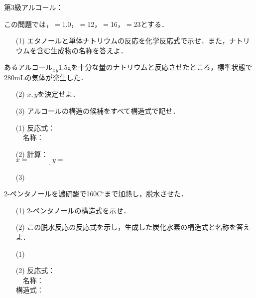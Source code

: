 \documentclass[a4paper,12pt]{ltjsreport}
\begin{document}
    \noindent 第3級アルコール：\newpage
    \begin{que}
        この問題では，$=$1.0，$=$12，$=$16，$=$23とする．
    \begin{itemize}
        \item [(1)]エタノールと単体ナトリウムの反応を化学反応式で示せ．また，ナトリウムを含む生成物の名称を答えよ．
    \end{itemize}
            あるアルコール$_{x}$$_{y}$1.5gを十分な量のナトリウムと反応させたところ，標準状態で280mLの気体が発生した．
            \begin{itemize}
                \item [(2)]$x,y$を決定せよ．
                \item [(3)]アルコールの構造の候補をすべて構造式で記せ．
            \end{itemize}
    \end{que}
    \ans
    \begin{itemize}
        \item [(1)]反応式：\\[15pt]
        　名称：\\[10pt]
        \item[(2)]計算：\\[70pt]$　　　　　　　　　　　　　　　　　　　　　　　　\underline{x=~~~~~~~~~~~~~~~y=~~~~~~~~~~~~}$\\[10pt]
        \item[(3)] 
    \end{itemize}
    \newpage
    \begin{que}
      2-ペンタノールを濃硫酸で160C$^\circ$まで加熱し，脱水させた．
      \begin{itemize}
        \item [(1)]2-ペンタノールの構造式を示せ．
        \item [(2)]この脱水反応の反応式を示し，生成した炭化水素の構造式と名称を答えよ．
      \end{itemize}
    \end{que}
    \ans
    \begin{itemize}
        \item [(1)]　\\[70pt]
        \item [(2)]反応式：\\[30pt]
        　名称：\\[30pt]
        構造式：
    \end{itemize}
            \newpage
\end{document}

